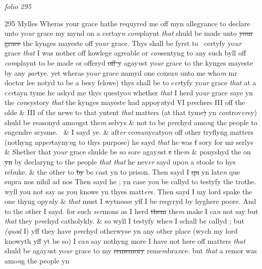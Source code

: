 \documentclass[12pt, a4paper]{book}
\begin{document}
\textit{folio 295}



{\color{Mahogany}295} Mylles  Wheras your grace hathe requyred me off myn allegyance to declare unto yo\textit{ur} grace my mynd on a certay\textit{n}
               \textit{com}playnt \textit{that} shuld be made unto \sout{your  grace} the kynges mayeste off yo\textit{ur} grace. Thys shall be fyrst to  certyfy yo\textit{ur} grace \textit{that} I was nother off kowlege agreable or \textit{con}sentyng to any such byll off \textit{com}playnt to be made or offeryd \sout{off y} agay\textit{n}st yo\textit{ur} grace to the kynges mayeste by any \textit{par}tye. yet wheras yo\textit{ur} grace namyd one coxsu\textit{n} unto me who\textit{m} mr doctor lee notyd to be a besy felowe) thys shall be to c\textit{er}tyfy yo\textit{ur} grace \textit{that} at a c\textit{er}tayn tyme he askyd me thys questyo\textit{n} whether \textit{that} I herd yo\textit{ur} grace saye yn the \textit{con}systory \textit{that} the kynges mayeste had appoy\textit{n}tyd VI p\textit{re}chers III off the olde \& III of  the newe to that yntent \textit{that} matters (at that tyme\sout{) }yn \textit{con}trov\textit{er}sy) shuld be reasonyd amo\textit{n}gst the\textit{m} selvys \& not to be p\textit{re}chyd amo\textit{n}g the  people to engendre scysme.  \& I sayd ye. \& aft\textit{er} co\textit{mun}ycatyo\textit{n} off other tryflyng matters (nothyng ap\textit{per}tayny\textit{n}g to thys purpose) he sayd \textit{that} he was \sout{f} sory for mr serlys \& Shether that yo\textit{ur} grace shulde be so sore agay\textit{n}st \sout{s} the\textit{m} \& ponyshyd the on \sout{yn }
               by
			 declaryng to  the people \textit{
                  that 
			that} he nev\textit{er} sayd upo\textit{n} a stoole to hys rebuke. \& the other to \sout{by }
               be 
			cast yn to prison. Then sayd I \sout{qu }yn late\textit{n} que supra nos nihil ad nos Then sayd he ; yn case you be callyd to  testyfy the trothe. wyll you not say as you knowe yn thyes matt\textit{er}s. Then sayd I my lord spake the one thyng opy\textit{n}ly \& \textit{that} must I wytnesse yff I be reqyryd by hyghere poore. And to the other I sayd. for such \textit{ser}mons as I herd \sout{them }the\textit{m}  make I ca\textit{n} not say but \textit{that} they p\textit{re}chyd catholykly. \& so wyll I testyfy whe\textit{n} I schall be callyd ; but \textit{(quod} I) yff they have p\textit{re}chyd otherwyse yn any other place (wych my lord knowyth yff yt be so) I ca\textit{n} say nothyng more I have not here off matters \textit{that} shuld be agay\textit{n}st yo\textit{ur} grace to my \sout{rememory} reme\textit{m}bra\textit{n}ce. but \textit{that} a remor was amo\textit{n}g the people yn 
			
\end{document}
